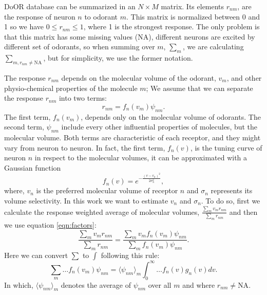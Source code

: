 \documentclass[11pt]{paper} %
\begin{document}
DoOR database can be summarized in an $N\times M$ matrix. 
Its elements $r_{nm}$, are the response of neuron $n$ to odorant $m$. 
This matrix is normalized between 0 and 1 so we have $0 \le r_{nm} \le 1$, where 1 is the strongest response.
The only problem is that this matrix has some missing values (NA), 
different neurons are excited by different set of odorants, 
so  when summing over $m$, $\sum_m$, we are calculating $\sum_{m, r_{nm} \neq \text{NA}}$, but for simplicity, 
we use the former notation. 

The response $r_{nm}$ depends on the molecular volume of the odorant, $v_m$, 
and other physio-chemical properties of the molecule $m$; 
We assume that we can separate the response $r_{nm}$ into two terms:
\begin{equation}
	r_{nm} = f_n(v_m) \psi_{nm}.
	\label{eqn:factors}
\end{equation}
The first term, $f_n(v_m)$, depends only on the molecular volume of odorants.
The second term, $\psi_{nm}$ include every other influential properties of molecules, but the molecular volume.
Both terms are characteristic of each receptor, and they might vary from neuron to neuron.
In fact, the first term, $f_n(v)$, is the tuning curve of neuron $n$ in respect to the molecular volumes, 
it can be approximated with a Gaussian function
\begin{equation}
	\displaystyle f_n(v) = e^{-\frac{(v-v_n)^2}{2\sigma^2_n}}, 
	\label{eqn:volume-dependence}
\end{equation}
where, $v_n$ is the preferred molecular volume of receptor $n$ and $\sigma_n$ represents its volume selectivity. 
In this work we want to estimate $v_n$ and $\sigma_n$. 
To do so, first we calculate the response weighted average of molecular volumes, 
$\frac{\sum_{m} v_m r_{nm}}{\sum_{m} r_{nm}}$ and then we use equation \ref{eqn:factors}:
\begin{equation}
	\frac{\displaystyle \sum_{m} v_m r_{nm}}{\displaystyle \sum_{m} r_{nm}} = \frac{\displaystyle \sum_{m} v_m f_n(v_m) \psi_{nm}}{\displaystyle \sum_{m} f_n(v_m) \psi_{nm}}.
	\label{eqn:sta}
\end{equation}
Here we can convert $\sum$ to $\int$ following this rule:
\begin{equation}
	\sum_{m} \dots f_n(v_m) \psi_{nm} =  \langle \psi_{nm} \rangle_m \int_0^\infty \dots f_n(v) g_n(v)  dv. 
	\label{eqn:sigma_to_int}
\end{equation}
In which, 
$\langle \psi_{nm} \rangle_m$ denotes the average of $\psi_{nm}$ over all $m$ and where $r_{nm} \neq \text{NA}$. 
\end{document}
